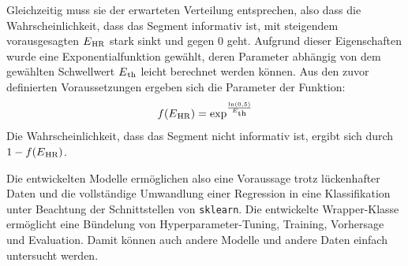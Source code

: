 Gleichzeitig muss sie der erwarteten Verteilung entsprechen, also dass die Wahrscheinlichkeit, dass das Segment informativ ist, mit steigendem vorausgesagten $E\textsubscript{HR}$ stark sinkt und gegen 0 geht. Aufgrund dieser Eigenschaften wurde eine Exponentialfunktion gewählt, deren Parameter abhängig von dem gewählten Schwellwert $E\textsubscript{th}$ leicht berechnet werden können. Aus den zuvor definierten Voraussetzungen ergeben sich die Parameter der Funktion:
\[
	f(E\textsubscript{HR}) = \text{exp}^{\frac{\text{ln}(0,5)}{E\textsubscript{th}}}
\]
Die Wahrscheinlichkeit, dass das Segment nicht informativ ist, ergibt sich durch $1-f(E\textsubscript{HR})$.

Die entwickelten Modelle ermöglichen also eine Voraussage trotz lückenhafter Daten und die vollständige Umwandlung einer Regression in eine Klassifikation unter Beachtung der Schnittstellen von \texttt{sklearn}. Die entwickelte Wrapper-Klasse ermöglicht eine Bündelung von Hyperparameter-Tuning, Training, Vorhersage und Evaluation. Damit können auch andere Modelle und andere Daten einfach untersucht werden.





